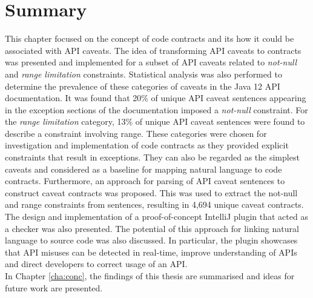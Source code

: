 \section{Summary}
\label{sec:contract-summary}
This chapter focused on the concept of code contracts and its how it could be associated with API caveats. The idea of transforming API caveats to contracts was presented and implemented for a subset of API caveats related to \textit{not-null} and \textit{range limitation} constraints. Statistical analysis was also performed to determine the prevalence of these categories of caveats in the Java 12 API documentation. It was found that 20\% of unique API caveat sentences appearing in the exception sections of the documentation imposed a \textit{not-null} constraint. For the \textit{range limitation} category, 13\% of unique API caveat sentences were found to describe a constraint involving range. These categories were chosen for investigation and implementation of code contracts as they provided explicit constraints that result in exceptions. They can also be regarded as the simplest caveats and considered as a baseline for mapping natural language to code contracts. Furthermore, an approach for parsing of API caveat sentences to construct caveat contracts was proposed. This was used to extract the not-null and range constraints from sentences, resulting in 4,694 unique caveat contracts. The design and implementation of a proof-of-concept IntelliJ plugin that acted as a checker was also presented. The potential of this approach for linking natural language to source code was also discussed. In particular, the plugin showcases that API misuses can be detected in real-time, improve understanding of APIs and direct developers to correct usage of an API.\\
In Chapter \ref{cha:conc}, the findings of this thesis are summarised and ideas for future work are presented.
